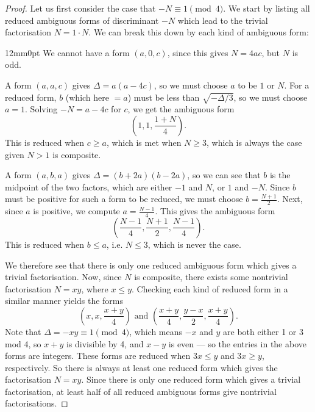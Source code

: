 \documentclass[honours,12pt]{unswthesis}
\numberwithin{equation}{section}
\begin{document}
\begin{proof}
    Let us first consider the case that $-N \equiv 1 \pmod{4}$.
    We start by listing all reduced ambiguous forms of discriminant $-N$ which lead to the trivial factorisation $N = 1 \cdot N$.
    We can break this down by each kind of ambiguous form:

    \begin{adjustwidth}{12mm}{0pt}
        \noindent
         \hspace{-3mm}
        We cannot have a form $(a, 0, c)$, since this gives $N = 4ac$, but $N$ is odd.

        \vspace{5mm}
        \noindent
         \hspace{-3mm}
        A form $(a, a, c)$ gives $\Delta = a(a-4c)$, so we must choose $a$ to be $1$ or $N$.
        For a reduced form, $b$ (which here $=a$) must be less than $\sqrt{-\Delta / 3}$, so we must choose $a = 1$.
        Solving $-N = a - 4c$ for $c$, we get the ambiguous form
        $$\left( 1, 1, \frac{1 + N}{4} \right).$$
        This is reduced when $c \geq a$, which is met when $N \geq 3$, which is always the case given $N > 1$ is composite.

        \vspace{5mm}
        \noindent
         \hspace{-3mm}
        A form $(a, b, a)$ gives $\Delta = (b + 2a)(b - 2a)$, so we can see that $b$ is the midpoint of the two factors, which are either $-1$ and $N$, or $1$ and $-N$.
        Since $b$ must be positive for such a form to be reduced, we must choose $b = \frac{N + 1}{2}$.
        Next, since $a$ is positive, we compute $a = \frac{N - 1}{4}$.
        This gives the ambiguous form
        $$\left( \frac{N - 1}{4}, \frac{N + 1}{2}, \frac{N - 1}{4} \right).$$
        This is reduced when $b \leq a$, i.e. $N \leq 3$, which is never the case.
    \end{adjustwidth}
    \vspace{2mm}
    We therefore see that there is only one reduced ambiguous form which gives a trivial factorisation.
    Now, since $N$ is composite, there exists some nontrivial factorisation $N = xy$, where $x \leq y$.
    Checking each kind of reduced form in a similar manner yields the forms
    $$\left(x, x, \frac{x + y}{4}\right) \text{ and } \left( \frac{x + y}{4}, \frac{y - x}{2}, \frac{x + y}{4} \right).$$
    Note that $\Delta = -xy \equiv 1 \pmod{4}$, which means $-x$ and $y$ are both either 1 or 3 mod 4, so $x + y$ is divisible by 4, and $x - y$ is even ---
    so the entries in the above forms are integers.
    These forms are reduced when $3x \leq y$ and $3x \geq y$, respectively.
    So there is always at least one reduced form which gives the factorisation $N = xy$.
    Since there is only one reduced form which gives a trivial factorisation, at least half of all reduced ambiguous forms give nontrivial factorisations.
    

\end{proof}
\end{document}
